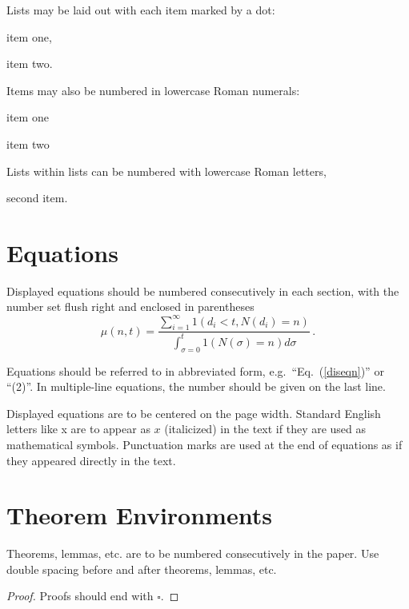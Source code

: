 \documentclass{ws-mpla}
\begin{document}
Lists may be laid out with each item marked by a dot:
\begin{itemlist}
 \item item one,
 \item item two.
\end{itemlist}
Items may also be numbered in lowercase Roman numerals:
\begin{romanlist}[(ii)]
\item item one
\item item two
	\begin{romanlist}[(b)]
	\item Lists within lists can be numbered with lowercase
              Roman letters,
	\item second item.
	\end{romanlist}
\end{romanlist}

\section{Equations}

Displayed equations should be numbered consecutively in each
section, with the number set flush right and enclosed in
parentheses
\begin{equation}
\mu(n, t) = \frac{\sum^\infty_{i=1} 1(d_i < t,
N(d_i) = n)}{\int^t_{\sigma=0} 1(N(\sigma) = n)d\sigma}\,.
\label{diseqn}
\end{equation}

Equations should be referred to in abbreviated form,
e.g.~``Eq.~(\ref{diseqn})'' or ``(2)''. In multiple-line
equations, the number should be given on the last line.

Displayed equations are to be centered on the page width.
Standard English letters like x are to appear as $x$
(italicized) in the text if they are used as mathematical
symbols. Punctuation marks are used at the end of equations as
if they appeared directly in the text.

\section{Theorem Environments}

\begin{theorem}
Theorems, lemmas, etc. are to be numbered
consecutively in the paper. Use double spacing before and after
theorems, lemmas, etc.
\end{theorem}

\begin{proof}
Proofs should end with $\square$.
\end{proof}
\end{document}
